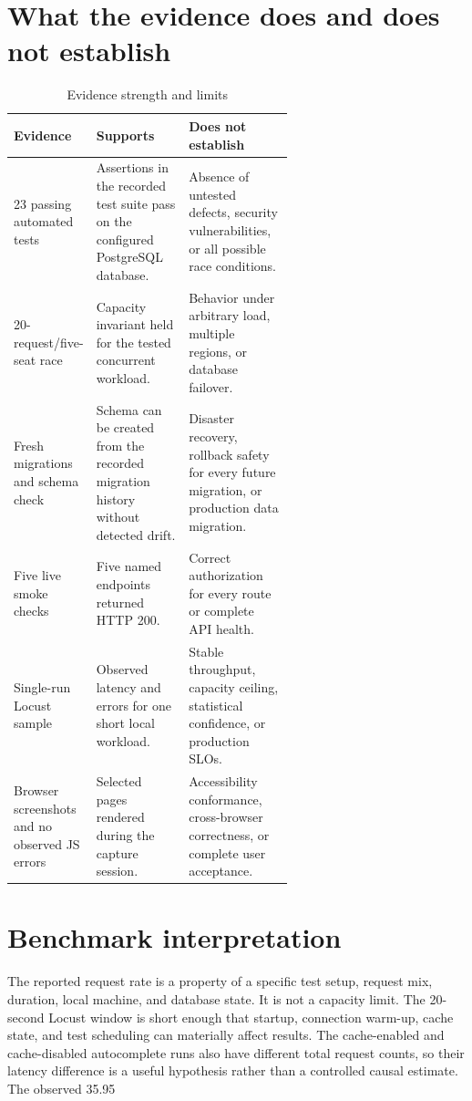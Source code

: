 \documentclass[11pt,a4paper,oneside]{report}
\begin{document}
\section{What the evidence does and does not establish}
\begin{table}[htbp]
\centering\small
\caption{Evidence strength and limits}\label{tab:evidence-strength}
\begin{tabularx}{\linewidth}{@{}p{0.28\linewidth}p{0.33\linewidth}X@{}}\toprule
\textbf{Evidence} & \textbf{Supports} & \textbf{Does not establish} \\\midrule
23 passing automated tests & Assertions in the recorded test suite pass on the configured PostgreSQL database. & Absence of untested defects, security vulnerabilities, or all possible race conditions. \\
20-request/five-seat race & Capacity invariant held for the tested concurrent workload. & Behavior under arbitrary load, multiple regions, or database failover. \\
Fresh migrations and schema check & Schema can be created from the recorded migration history without detected drift. & Disaster recovery, rollback safety for every future migration, or production data migration. \\
Five live smoke checks & Five named endpoints returned HTTP 200. & Correct authorization for every route or complete API health. \\
Single-run Locust sample & Observed latency and errors for one short local workload. & Stable throughput, capacity ceiling, statistical confidence, or production SLOs. \\
Browser screenshots and no observed JS errors & Selected pages rendered during the capture session. & Accessibility conformance, cross-browser correctness, or complete user acceptance. \\
\bottomrule
\end{tabularx}
\end{table}

\section{Benchmark interpretation}
The reported request rate is a property of a specific test setup, request mix, duration, local machine, and database state. It is not a capacity limit. The 20-second Locust window is short enough that startup, connection warm-up, cache state, and test scheduling can materially affect results. The cache-enabled and cache-disabled autocomplete runs also have different total request counts, so their latency difference is a useful hypothesis rather than a controlled causal estimate. The observed 35.95\\%
\end{document}
